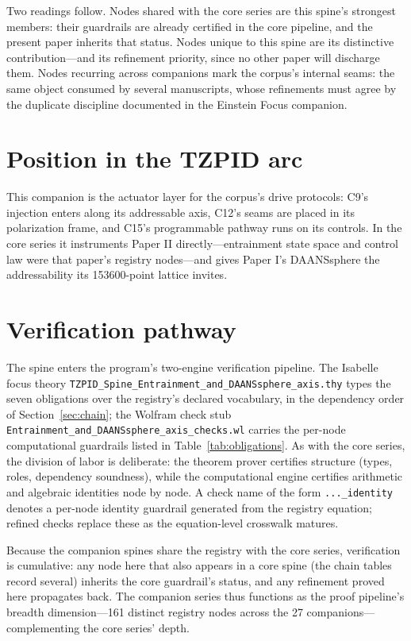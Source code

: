 \documentclass[11pt]{article}
\theoremstyle{remark}
\begin{document}
Two readings follow. Nodes shared with the core series are this spine's strongest members: their guardrails are already certified in the core pipeline, and the present paper inherits that status. Nodes unique to this spine are its distinctive contribution---and its refinement priority, since no other paper will discharge them. Nodes recurring across companions mark the corpus's internal seams: the same object consumed by several manuscripts, whose refinements must agree by the duplicate discipline documented in the Einstein Focus companion.

\section{Position in the TZPID arc}
\label{sec:arc}

This companion is the actuator layer for the corpus's drive protocols: C9's injection enters along its addressable axis, C12's seams are placed in its polarization frame, and C15's programmable pathway runs on its controls. In the core series it instruments Paper II directly---entrainment state space and control law were that paper's registry nodes---and gives Paper I's DAANSsphere the addressability its 153600-point lattice invites.

\section{Verification pathway}
\label{sec:verify}

The spine enters the program's two-engine verification pipeline. The Isabelle focus theory \texttt{TZPID\_Spine\_Entrainment\_and\_DAANSsphere\_axis.thy} types the seven obligations over the registry's declared vocabulary, in the dependency order of Section~\ref{sec:chain}; the Wolfram check stub \texttt{Entrainment\_and\_DAANSsphere\_axis\_checks.wl} carries the per-node computational guardrails listed in Table~\ref{tab:obligations}. As with the core series, the division of labor is deliberate: the theorem prover certifies structure (types, roles, dependency soundness), while the computational engine certifies arithmetic and algebraic identities node by node. A check name of the form \texttt{...\_identity} denotes a per-node identity guardrail generated from the registry equation; refined checks replace these as the equation-level crosswalk matures.

Because the companion spines share the registry with the core series, verification is cumulative: any node here that also appears in a core spine (the chain tables record several) inherits the core guardrail's status, and any refinement proved here propagates back. The companion series thus functions as the proof pipeline's breadth dimension---161 distinct registry nodes across the 27 companions---complementing the core series' depth.
\end{document}
